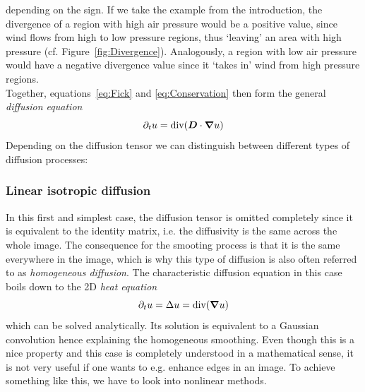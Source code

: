 depending on the sign.
If we take the example from the introduction, the divergence of a region with high air pressure 
would be a positive value, since wind flows from high to low pressure regions, thus `leaving' an 
area with high pressure (cf. Figure~\ref{fig:Divergence}).
Analogously, a region with low air pressure would have a negative divergence value since it 
`takes in' wind from high pressure regions.\\
Together, equations~\eqref{eq:Fick} and \eqref{eq:Conservation} then form the general \textit{diffusion
    equation}\cite{dic18-02, weickert96}
\begin{equation}
    \partial_t u = \textnormal{div}(\boldsymbol D\cdot\boldsymbol\nabla u)\label{eq:Diffusion}
\end{equation}
Depending on the diffusion tensor we can distinguish between different types of diffusion
processes:
\subsubsection*{Linear isotropic diffusion}
In this first and simplest case, the diffusion tensor is omitted completely since it is equivalent
to the identity matrix, i.e. the diffusivity is the same across the whole image.
The consequence for the smooting process is that it is the same everywhere in the image, which
is why this type of diffusion is also often referred to as \textit{homogeneous diffusion}.
The characteristic diffusion equation in this case boils down to the 2D \textit{heat equation}
\begin{equation}
    \partial_t u = \Delta u = \textnormal{div}(\boldsymbol\nabla u)
\end{equation}
which can be solved analytically. Its solution is equivalent to a Gaussian convolution
hence explaining the homogeneous smoothing. Even though this is a nice property and this case is
completely understood in a mathematical sense, it is not very useful if one wants to e.g. enhance
edges in an image. To achieve something like this, we have to look into nonlinear methods.

